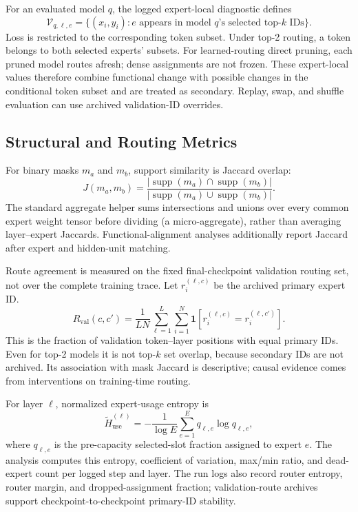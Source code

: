 \documentclass{article}
\begin{document}
For an evaluated model $q$, the logged expert-local diagnostic defines
\begin{equation}
\mathcal{V}_{q,\ell,e}
=
\{(x_i,y_i):e\text{ appears in model }q\text{'s selected top-}k\text{ IDs}\}.
\label{eq:app_local_set}
\end{equation}
Loss is restricted to the corresponding token subset. Under top-2 routing, a
token belongs to both selected experts' subsets. For learned-routing direct
pruning, each pruned model routes afresh; dense assignments are not frozen.
These expert-local values therefore combine functional change with possible
changes in the conditional token subset and are treated as secondary. Replay,
swap, and shuffle evaluation can use archived validation-ID overrides.

\subsection{Structural and Routing Metrics}

For binary masks $m_a$ and $m_b$, support similarity is Jaccard overlap:
\begin{equation}
J(m_a,m_b)
=
\frac{
|\operatorname{supp}(m_a)\cap\operatorname{supp}(m_b)|
}{
|\operatorname{supp}(m_a)\cup\operatorname{supp}(m_b)|
}.
\label{eq:app_jaccard}
\end{equation}
The standard aggregate helper sums intersections and unions over every common
expert weight tensor before dividing (a micro-aggregate), rather than averaging
layer--expert Jaccards. Functional-alignment analyses additionally report
Jaccard after expert and hidden-unit matching.

Route agreement is measured on the fixed final-checkpoint validation routing
set, not over the complete training trace. Let $r_i^{(\ell,c)}$ be the archived
primary expert ID.
\begin{equation}
R_{\mathrm{val}}(c,c')
=
\frac{1}{LN}
\sum_{\ell=1}^{L}
\sum_{i=1}^{N}
\mathbf{1}\!\left[r_i^{(\ell,c)}=r_i^{(\ell,c')}\right].
\label{eq:app_route_agreement}
\end{equation}
This is the fraction of validation token--layer positions with equal primary
IDs. Even for top-2 models it is not top-$k$ set overlap, because secondary IDs
are not archived. Its association with mask Jaccard is descriptive; causal
evidence comes from interventions on training-time routing.

For layer $\ell$, normalized expert-usage entropy is
\begin{equation}
\widetilde H_{\mathrm{use}}^{(\ell)}
=
-
\frac{1}{\log E}
\sum_{e=1}^{E}q_{\ell,e}\log q_{\ell,e},
\label{eq:app_usage_entropy}
\end{equation}
where $q_{\ell,e}$ is the pre-capacity selected-slot fraction assigned to expert
$e$. The analysis computes this entropy, coefficient of variation, max/min
ratio, and dead-expert count per logged step and layer. The run logs also record
router entropy, router margin, and dropped-assignment fraction; validation-route
archives support checkpoint-to-checkpoint primary-ID stability.
\end{document}
